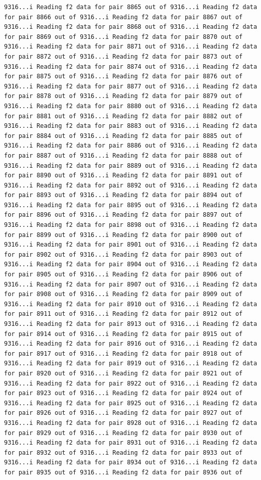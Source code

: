 \documentclass[
]{article}
\begin{document}
\begin{verbatim}
9316...i Reading f2 data for pair 8865 out of 9316...i Reading f2 data for pair 8866 out of 9316...i Reading f2 data for pair 8867 out of 9316...i Reading f2 data for pair 8868 out of 9316...i Reading f2 data for pair 8869 out of 9316...i Reading f2 data for pair 8870 out of 9316...i Reading f2 data for pair 8871 out of 9316...i Reading f2 data for pair 8872 out of 9316...i Reading f2 data for pair 8873 out of 9316...i Reading f2 data for pair 8874 out of 9316...i Reading f2 data for pair 8875 out of 9316...i Reading f2 data for pair 8876 out of 9316...i Reading f2 data for pair 8877 out of 9316...i Reading f2 data for pair 8878 out of 9316...i Reading f2 data for pair 8879 out of 9316...i Reading f2 data for pair 8880 out of 9316...i Reading f2 data for pair 8881 out of 9316...i Reading f2 data for pair 8882 out of 9316...i Reading f2 data for pair 8883 out of 9316...i Reading f2 data for pair 8884 out of 9316...i Reading f2 data for pair 8885 out of 9316...i Reading f2 data for pair 8886 out of 9316...i Reading f2 data for pair 8887 out of 9316...i Reading f2 data for pair 8888 out of 9316...i Reading f2 data for pair 8889 out of 9316...i Reading f2 data for pair 8890 out of 9316...i Reading f2 data for pair 8891 out of 9316...i Reading f2 data for pair 8892 out of 9316...i Reading f2 data for pair 8893 out of 9316...i Reading f2 data for pair 8894 out of 9316...i Reading f2 data for pair 8895 out of 9316...i Reading f2 data for pair 8896 out of 9316...i Reading f2 data for pair 8897 out of 9316...i Reading f2 data for pair 8898 out of 9316...i Reading f2 data for pair 8899 out of 9316...i Reading f2 data for pair 8900 out of 9316...i Reading f2 data for pair 8901 out of 9316...i Reading f2 data for pair 8902 out of 9316...i Reading f2 data for pair 8903 out of 9316...i Reading f2 data for pair 8904 out of 9316...i Reading f2 data for pair 8905 out of 9316...i Reading f2 data for pair 8906 out of 9316...i Reading f2 data for pair 8907 out of 9316...i Reading f2 data for pair 8908 out of 9316...i Reading f2 data for pair 8909 out of 9316...i Reading f2 data for pair 8910 out of 9316...i Reading f2 data for pair 8911 out of 9316...i Reading f2 data for pair 8912 out of 9316...i Reading f2 data for pair 8913 out of 9316...i Reading f2 data for pair 8914 out of 9316...i Reading f2 data for pair 8915 out of 9316...i Reading f2 data for pair 8916 out of 9316...i Reading f2 data for pair 8917 out of 9316...i Reading f2 data for pair 8918 out of 9316...i Reading f2 data for pair 8919 out of 9316...i Reading f2 data for pair 8920 out of 9316...i Reading f2 data for pair 8921 out of 9316...i Reading f2 data for pair 8922 out of 9316...i Reading f2 data for pair 8923 out of 9316...i Reading f2 data for pair 8924 out of 9316...i Reading f2 data for pair 8925 out of 9316...i Reading f2 data for pair 8926 out of 9316...i Reading f2 data for pair 8927 out of 9316...i Reading f2 data for pair 8928 out of 9316...i Reading f2 data for pair 8929 out of 9316...i Reading f2 data for pair 8930 out of 9316...i Reading f2 data for pair 8931 out of 9316...i Reading f2 data for pair 8932 out of 9316...i Reading f2 data for pair 8933 out of 9316...i Reading f2 data for pair 8934 out of 9316...i Reading f2 data for pair 8935 out of 9316...i Reading f2 data for pair 8936 out of 
\end{verbatim}
\end{document}
